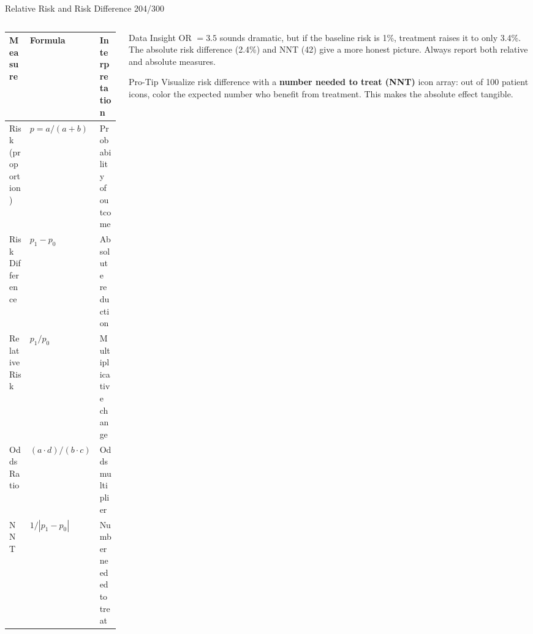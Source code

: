 \documentclass[10pt]{beamer}
\newcommand{\smark}[1]{\hfill{\scriptsize\color{codegray}#1}}
\begin{document}
\begin{frame}{Relative Risk and Risk Difference}
\smark{204/300}
\begin{columns}[T]
\begin{column}{0.50\textwidth}
\centering\small
\begin{tabular}{@{}lll@{}}
    \toprule
    \textbf{Measure} & \textbf{Formula} & \textbf{Interpretation} \\
    \midrule
    Risk (proportion) & $p = a/(a+b)$        & Probability of outcome \\
    Risk Difference   & $p_1 - p_0$          & Absolute reduction \\
    Relative Risk     & $p_1 / p_0$          & Multiplicative change \\
    Odds Ratio        & $(a \cdot d)/(b \cdot c)$ & Odds multiplier \\
    NNT               & $1 / |p_1 - p_0|$    & Number needed to treat \\
    \bottomrule
\end{tabular}
\end{column}
\begin{column}{0.47\textwidth}
\begin{exampleblock}{Data Insight}
    \scriptsize OR $= 3.5$ sounds dramatic, but if the baseline risk is 1\%, treatment raises it to only 3.4\%. The absolute risk difference (2.4\%) and NNT (42) give a more honest picture. Always report both relative and absolute measures.
\end{exampleblock}
\vspace{0.1cm}
\begin{alertblock}{Pro-Tip}
    \scriptsize Visualize risk difference with a \textbf{number needed to treat (NNT)} icon array: out of 100 patient icons, color the expected number who benefit from treatment. This makes the absolute effect tangible.
\end{alertblock}
\end{column}
\end{columns}
\end{frame}
\end{document}
